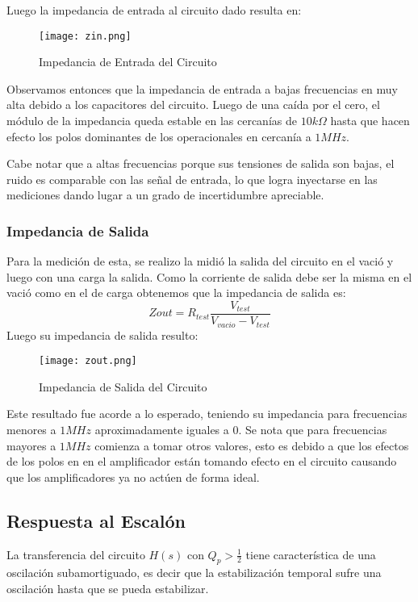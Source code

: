 Luego la impedancia de entrada al circuito dado resulta en:

\begin{figure}[h]
    \centering
    \texttt{[image: zin.png]}
    \caption{Impedancia de Entrada del Circuito}
    \label{ej1zin}
\end{figure}

Observamos entonces que la impedancia de entrada a bajas frecuencias en muy alta debido a los capacitores del circuito. Luego de una caída por el cero, el módulo de la impedancia queda estable en las cercanías de $10k\Omega$ hasta que hacen efecto los polos dominantes de los operacionales en cercanía a $1MHz$. 

Cabe notar que a altas frecuencias porque sus tensiones de salida son bajas, el ruido es comparable con las señal de entrada, lo que logra inyectarse en las mediciones dando lugar a un grado de incertidumbre apreciable.

\subsubsection{Impedancia de Salida}

Para la medición de esta, se realizo la midió la salida del circuito en el vació y luego con una carga la salida. Como la corriente de salida debe ser la misma en el vació como en el de carga obtenemos que la impedancia de salida es:
$$Zout = R_{test} \frac{V_{test}}{V_{vacio} - V_{test}}$$
Luego su impedancia de salida resulto:

\begin{figure}[H]
    \centering
    \texttt{[image: zout.png]}
    \caption{Impedancia de Salida del Circuito}
    \label{ej1zout}
\end{figure}

Este resultado fue acorde a lo esperado, teniendo su impedancia para frecuencias menores a $1MHz$ aproximadamente iguales a 0. Se nota que para frecuencias mayores a $1MHz$ comienza a tomar otros valores, esto es debido a que los efectos de los polos en en el amplificador están tomando efecto en el circuito causando que los amplificadores ya no actúen de forma ideal.

\subsection{Respuesta al Escalón}

La transferencia del circuito $H(s)$ con $Q_p>\frac{1}{2}$ tiene característica de una oscilación subamortiguado, es decir que la estabilización temporal sufre una oscilación hasta que se pueda estabilizar. 

